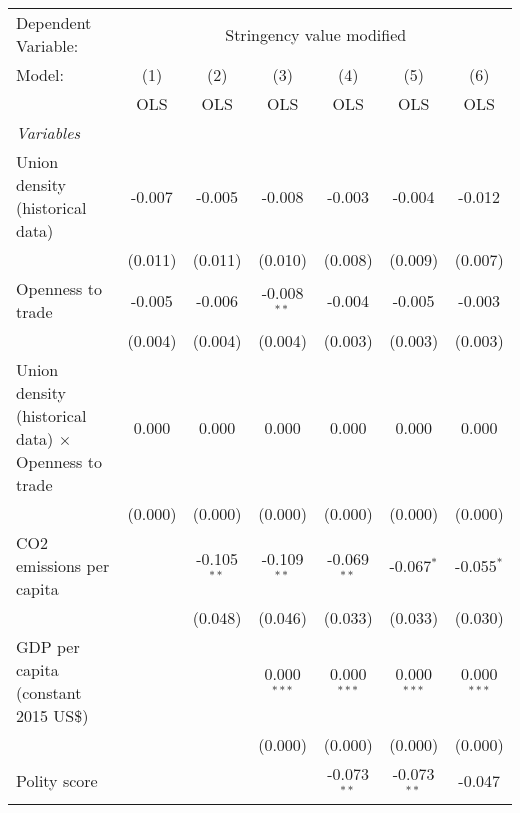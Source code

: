 
\begingroup
\centering
\begin{tabular}{lcccccc}
   \toprule
   Dependent Variable: & \multicolumn{6}{c}{Stringency value modified}\\
   Model:                                                      & (1)     & (2)           & (3)           & (4)           & (5)           & (6)\\  
                                                               &  OLS    & OLS           & OLS           & OLS           & OLS           & OLS\\  
   \midrule
   \emph{Variables}\\
   Union density (historical data)                             & -0.007  & -0.005        & -0.008        & -0.003        & -0.004        & -0.012\\   
                                                               & (0.011) & (0.011)       & (0.010)       & (0.008)       & (0.009)       & (0.007)\\   
   Openness to trade                                           & -0.005  & -0.006        & -0.008$^{**}$ & -0.004        & -0.005        & -0.003\\   
                                                               & (0.004) & (0.004)       & (0.004)       & (0.003)       & (0.003)       & (0.003)\\   
   Union density (historical data) $\times$ Openness to trade  & 0.000   & 0.000         & 0.000         & 0.000         & 0.000         & 0.000\\   
                                                               & (0.000) & (0.000)       & (0.000)       & (0.000)       & (0.000)       & (0.000)\\   
   CO2 emissions per capita                                    &         & -0.105$^{**}$ & -0.109$^{**}$ & -0.069$^{**}$ & -0.067$^{*}$  & -0.055$^{*}$\\   
                                                               &         & (0.048)       & (0.046)       & (0.033)       & (0.033)       & (0.030)\\   
   GDP per capita (constant 2015 US\$)                         &         &               & 0.000$^{***}$ & 0.000$^{***}$ & 0.000$^{***}$ & 0.000$^{***}$\\   
                                                               &         &               & (0.000)       & (0.000)       & (0.000)       & (0.000)\\   
   Polity score                                                &         &               &               & -0.073$^{**}$ & -0.073$^{**}$ & -0.047\\   

\end{tabular}
